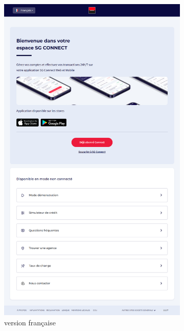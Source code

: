 \newpage

\begin{figure}[!h]
    \centering
    \begin{subfigure}[b]{0.49\textwidth}
        \centering
        \includegraphics[width=\textwidth]{images/screens/accueil/tablette.png}
        \caption{version française}
    \end{subfigure}
    \hfill
    \begin{subfigure}[b]{0.49\textwidth}
        \centering

\end{subfigure}
\end{figure}
